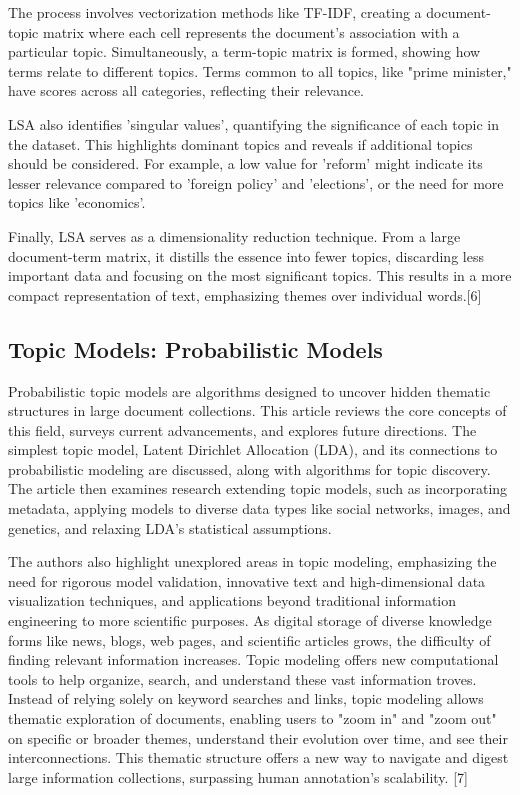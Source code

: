 The process involves vectorization methods like TF-IDF, creating a document-topic matrix where each cell represents the document's association with a particular topic. Simultaneously, a term-topic matrix is formed, showing how terms relate to different topics. Terms common to all topics, like "prime minister," have scores across all categories, reflecting their relevance.

LSA also identifies 'singular values', quantifying the significance of each topic in the dataset. This highlights dominant topics and reveals if additional topics should be considered. For example, a low value for 'reform' might indicate its lesser relevance compared to 'foreign policy' and 'elections', or the need for more topics like 'economics'.

Finally, LSA serves as a dimensionality reduction technique. From a large document-term matrix, it distills the essence into fewer topics, discarding less important data and focusing on the most significant topics. This results in a more compact representation of text, emphasizing themes over individual words.[6]

\subsection*{Topic Models: Probabilistic Models}


Probabilistic topic models are algorithms designed to uncover hidden thematic structures in large document collections. This article reviews the core concepts of this field, surveys current advancements, and explores future directions. The simplest topic model, Latent Dirichlet Allocation (LDA), and its connections to probabilistic modeling are discussed, along with algorithms for topic discovery. The article then examines research extending topic models, such as incorporating metadata, applying models to diverse data types like social networks, images, and genetics, and relaxing LDA's statistical assumptions.

The authors also highlight unexplored areas in topic modeling, emphasizing the need for rigorous model validation, innovative text and high-dimensional data visualization techniques, and applications beyond traditional information engineering to more scientific purposes. As digital storage of diverse knowledge forms like news, blogs, web pages, and scientific articles grows, the difficulty of finding relevant information increases. Topic modeling offers new computational tools to help organize, search, and understand these vast information troves. Instead of relying solely on keyword searches and links, topic modeling allows thematic exploration of documents, enabling users to "zoom in" and "zoom out" on specific or broader themes, understand their evolution over time, and see their interconnections. This thematic structure offers a new way to navigate and digest large information collections, surpassing human annotation's scalability.   [7]

